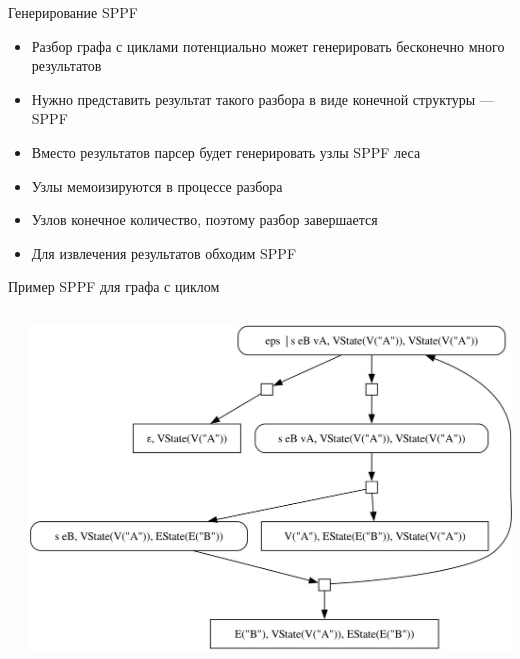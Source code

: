 \documentclass[aspectratio=169]{beamer}
\begin{document}
\begin{frame}{Генерирование SPPF}
  \begin{itemize}
    \item Разбор графа с циклами потенциально может генерировать бесконечно много результатов
    \item Нужно представить результат такого разбора в виде конечной структуры --- SPPF
    \item Вместо результатов парсер будет генерировать узлы SPPF леса
    \item Узлы мемоизируются в процессе разбора
    \item Узлов конечное количество, поэтому разбор завершается
    \item Для извлечения результатов обходим SPPF
  \end{itemize}
\end{frame}


\begin{frame}{Пример SPPF для графа с циклом}
  \begin{columns}
    \begin{column}{0.2\textwidth}
    \end{column}
    \begin{column}{0.8\textwidth}
      \raggedright{\includegraphics[scale=0.3]{images/sppf_loop.png}}
    \end{column}
  \end{columns}
\end{frame}
\end{document}
